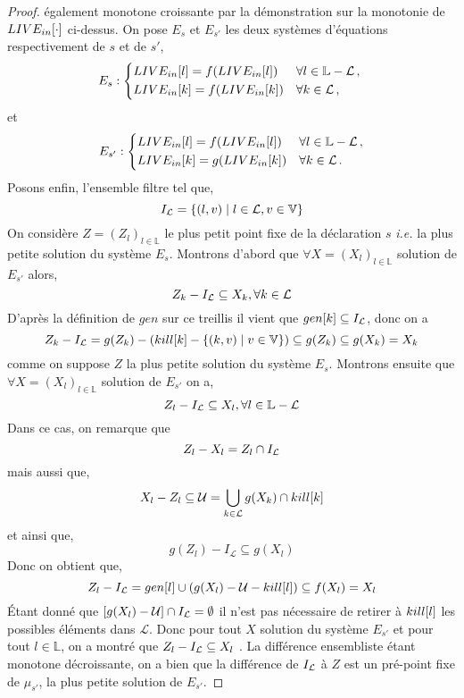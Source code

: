 \documentclass[a4paper, 11pt]{article}
\begin{document}
\begin{proof}
	également monotone croissante par la démonstration sur la monotonie de $LIVE_{in}[\cdot]$ ci-dessus.
	On pose $E_s$ et $E_{s'}$ les deux systèmes d'équations respectivement de $s$ et de $s'$,
	\[
	E_s :
	\begin{dcases*}
		\livein{l} = f(\livein{l}) &$\forall l \in \mathbb{L} - \mathcal{L}$\,, \\
		\livein{k} = f(\livein{k}) &$\forall k \in \mathcal{L}$\,,
	\end{dcases*}
	\]
	et
	\[
	E_{s'} :
	\begin{dcases*}
		\livein{l} = f(\livein{l}) &$\forall l \in \mathbb{L} - \mathcal{L}$\,,\\
		\livein{k} = g(\livein{k}) &$\forall k \in \mathcal{L}$\,.
	\end{dcases*}
	\]
	Posons enfin, l'ensemble filtre tel que,
	\[
		I_{\mathcal{L}} = \{(l, v) \mid l \in \mathcal{L}, v \in \mathbb{V}\}
	\]
	On considère $Z = (Z_l)_{l\in \mathbb{L}}$ le plus petit point fixe de la déclaration $s$ \textit{i.e.} la plus petite solution du système $E_s$.
	Montrons d'abord que $\forall X = (X_l)_{l\in \mathbb{L}}$ solution de $E_{s'}$ alors,
	\[Z_k - I_{\mathcal{L}} \subseteq X_k, \forall k \in \mathcal{L}\]
	D'après la définition de $gen$ sur ce treillis il vient que $gen[k] \subseteq I_{\mathcal{L}}$, donc on a
	\[Z_k - I_{\mathcal{L}} = g(Z_k) - (kill[k] - \{(k, v) \mid v \in \mathbb{V}\}) \subseteq g(Z_k) \subseteq g(X_k) = X_k\]
	comme on suppose $Z$ la plus petite solution du système $E_s$.
	Montrons ensuite que $\forall X = (X_l)_{l\in \mathbb{L}}$ solution de $E_{s'}$ on a,
	\[
		Z_l - I_{\mathcal{L}} \subseteq X_l, \forall l \in \mathbb{L} - \mathcal{L}
	\]
	Dans ce cas, on remarque que 
	\[Z_l - X_l = Z_l \cap I_{\mathcal{L}}\] 
	mais aussi que, 
	\[X_l - Z_l \subseteq \mathcal{U} = \bigcup\limits_{k\in \mathcal{L}} g(X_k) \cap kill[k]\]
	et ainsi que,
	\[g(Z_l) - I_{\mathcal{L}} \subseteq g(X_l)\]
	Donc on obtient que,
	\[
		Z_l - I_{\mathcal{L}} = gen[l] \cup (g(X_l) - \mathcal{U} - kill[l]) \subseteq f(X_l) = X_l
	\]
	Étant donné que $[g(X_l) - \mathcal{U}] \cap I_{\mathcal{L}} = \emptyset$ il n'est pas nécessaire de retirer à $kill[l]$ les possibles
	éléments dans $\mathcal{L}$.
	Donc pour tout $X$ solution du système $E_{s'}$ et pour tout $l \in \mathbb{L}$, on a montré que $Z_l - I_{\mathcal{L}} \subseteq X_l$ .
	La différence ensembliste étant monotone décroissante, on a bien que la différence de $I_{\mathcal{L}}$ à $Z$
	est un pré-point fixe de $\mu_{s'}$, la plus petite solution de $E_{s'}$.
\end{proof}
\end{document}
